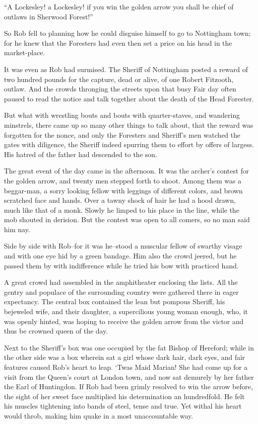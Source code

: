 ``A Lockesley! a Lockesley! if you win the golden arrow you shall be
chief of outlaws in Sherwood Forest!''

So Rob fell to planning how he could disguise himself to go to
Nottingham town; for he knew that the Foresters had even then set a
price on his head in the market-place.

It was even as Rob had surmised. The Sheriff of Nottingham posted a
reward of two hundred pounds for the capture, dead or alive, of one
Robert Fitzooth, outlaw. And the crowds thronging the streets upon that
busy Fair day often paused to read the notice and talk together about
the death of the Head Forester.

But what with wrestling bouts and bouts with quarter-staves, and
wandering minstrels, there came up so many other things to talk about,
that the reward was forgotten for the nonce, and only the Foresters and
Sheriff's men watched the gates with diligence, the Sheriff indeed
spurring them to effort by offers of largess. His hatred of the father
had descended to the son.

The great event of the day came in the afternoon. It was the archer's
contest for the golden arrow, and twenty men stepped forth to shoot.
Among them was a beggar-man, a sorry looking fellow with leggings of
different colors, and brown scratched face and hands. Over a tawny shock
of hair he had a hood drawn, much like that of a monk. Slowly he limped
to his place in the line, while the mob shouted in derision. But the
contest was open to all comers, so no man said him nay.

Side by side with Rob--for it was he--stood a muscular fellow of swarthy
visage and with one eye hid by a green bandage. Him also the crowd
jeered, but he passed them by with indifference while he tried his bow
with practiced hand.

A great crowd had assembled in the amphitheater enclosing the lists. All
the gentry and populace of the surrounding country were gathered there
in eager expectancy. The central box contained the lean but pompous
Sheriff, his bejeweled wife, and their daughter, a supercilious young
woman enough, who, it was openly hinted, was hoping to receive the
golden arrow from the victor and thus be crowned queen of the day.

Next to the Sheriff's box was one occupied by the fat Bishop of
Hereford; while in the other side was a box wherein sat a girl whose
dark hair, dark eyes, and fair features caused Rob's heart to leap.
`Twas Maid Marian! She had come up for a visit from the Queen's court at
London town, and now sat demurely by her father the Earl of Huntingdon.
If Rob had been grimly resolved to win the arrow before, the sight of
her sweet face multiplied his determination an hundredfold. He felt his
muscles tightening into bands of steel, tense and true. Yet withal his
heart would throb, making him quake in a most unaccountable way.

